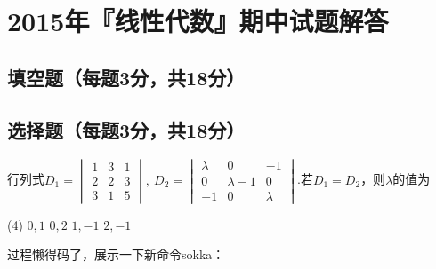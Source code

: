 \chapter{2015年『线性代数』期中试题解答}
\section{填空题（每题3分，共18分）}

\section{选择题（每题3分，共18分）}

\begin{exercise}
    行列式$D_1=
    \begin{vmatrix}
        1 & 3 & 1\\
        2 & 2 & 3\\
        3 & 1 & 5
    \end{vmatrix}
    ,\ D_2=
    \begin{vmatrix}
        \lambda & 0 & -1\\
        0 & \lambda-1 & 0\\
        -1 & 0 & \lambda
    \end{vmatrix}
    $.若$D_1=D_2$，则$\lambda$的值为
    \begin{tasks}(4)
        \task $0,1$
        \task $0,2$
        \task $1,-1$
        \task $2,-1$
    \end{tasks}
\end{exercise}

\begin{solution}
    过程懒得码了，展示一下新命令sokka：

\end{solution}
\newpage
\begin{exercise}
    
\end{exercise}